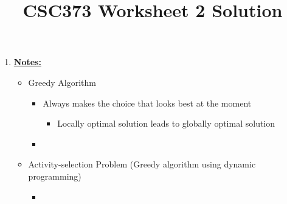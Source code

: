 \documentclass[12pt]{article}
\begin{document}
\title{CSC373 Worksheet 2 Solution}
\maketitle

\bigskip

\begin{enumerate}[1.]
    \item

    \bigskip

    \underline{\textbf{Notes:}}

    \bigskip

    \begin{itemize}
        \item Greedy Algorithm

        \begin{itemize}
            \item Always makes the choice that looks best at the moment

            \begin{itemize}
                \item Locally optimal solution leads to globally optimal solution
            \end{itemize}


            \item
        \end{itemize}

        \item Activity-selection Problem (Greedy algorithm using dynamic programming)

        \begin{itemize}
            \item
        \end{itemize}
    \end{itemize}
\end{enumerate}
\end{document}
